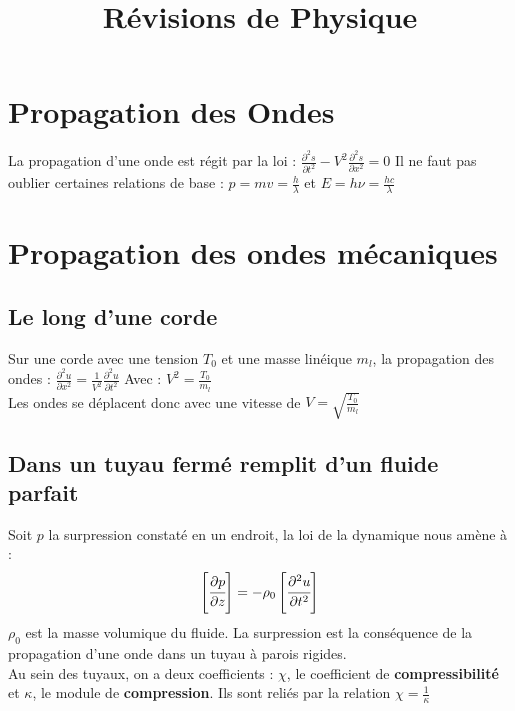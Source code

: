 \documentclass{article}
\begin{document}
	\title{Révisions de Physique}
	\tableofcontents
\section{Propagation des Ondes}
	La propagation d'une onde est régit par la loi : $\frac{\partial^2s}{\partial t^2}-V^2\frac{\partial^2s}{\partial x^2}=0$
	Il ne faut pas oublier certaines relations de base : $p=mv=\frac{h}{\lambda}$ et
	$E=h\nu=\frac{hc}{\lambda}$
\section{Propagation des ondes mécaniques}
\subsection{Le long d'une corde}
Sur une corde avec une tension $T_0$ et une masse linéique $m_l$, la propagation des ondes :
$\frac{\partial^2u}{\partial x^2}=\frac{1}{V^2}\frac{\partial^2u}{\partial t^2}$
Avec : $V^2=\frac{T_0}{m_l}$\\
Les ondes se déplacent donc avec une vitesse de $V=\sqrt{\frac{T_0}{m_l}}$
\subsection{Dans un tuyau fermé remplit d'un fluide parfait}
Soit $p$ la surpression constaté en un endroit, la loi de la dynamique nous amène à :
$$ \left[\cfrac{\partial p}{\partial z}\right] = -\rho_0\left[\cfrac{\partial^2u}{\partial t^2}\right]$$
$\rho_0$ est la masse volumique du fluide. La surpression est la conséquence de la propagation d'une onde dans un tuyau à parois rigides.\\
Au sein des tuyaux, on a deux coefficients : $\chi$, le coefficient de \textbf{compressibilité} et $\kappa$, le module de \textbf{compression}. Ils sont reliés par la relation $\chi=\frac{1}{\kappa}$
\end{document}
